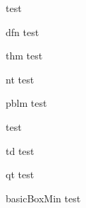 \documentclass{article}[10pt]
\begin{document}
test

\begin{boxDefinition}{dfn}
  test
\end{boxDefinition}

\begin{boxTheorem}{thm}
  test
\end{boxTheorem}

\begin{boxNote}{nt}
  test
\end{boxNote}

\begin{boxProblem}{pblm}
  test
\end{boxProblem}

\begin{boxExample}{ex}
  test
\end{boxExample}

\begin{boxTODO}{td}
  test
\end{boxTODO}

\begin{boxQuote}{qt}
  test
\end{boxQuote}

\begin{basicBoxMin}[box]{basicBoxMin}
  test
\end{basicBoxMin}
\end{document}

